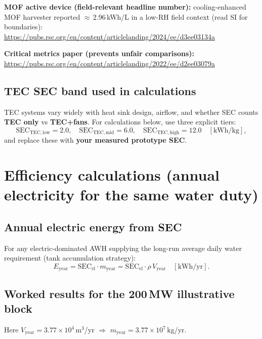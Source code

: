 \documentclass[11pt,a4paper]{article}
\begin{document}
\textbf{MOF active device (field-relevant headline number):} cooling-enhanced MOF harvester reported $\approx$\,2.96\,kWh/L in a low-RH field context (read SI for boundaries):\\
\url{https://pubs.rsc.org/en/content/articlelanding/2024/ee/d3ee03134a}

\textbf{Critical metrics paper (prevents unfair comparisons):}\\
\url{https://pubs.rsc.org/en/content/articlelanding/2022/ee/d2ee03079a}

\subsection{TEC SEC band used in calculations}
TEC systems vary widely with heat sink design, airflow, and whether SEC counts \textbf{TEC only} vs \textbf{TEC+fans}. For calculations below, use three explicit tiers:
\begin{equation}
\mathrm{SEC}_{\mathrm{TEC,low}}=2.0,\quad
\mathrm{SEC}_{\mathrm{TEC,mid}}=6.0,\quad
\mathrm{SEC}_{\mathrm{TEC,high}}=12.0\quad[\mathrm{kWh/kg}],
\end{equation}
and replace these with \textbf{your measured prototype SEC}.

\section{Efficiency calculations (annual electricity for the same water duty)}

\subsection{Annual electric energy from SEC}
For any electric-dominated AWH supplying the long-run average daily water requirement (tank accumulation strategy):
\begin{equation}
E_{\mathrm{year}}=\mathrm{SEC}_{\mathrm{el}}\cdot m_{\mathrm{year}}
=\mathrm{SEC}_{\mathrm{el}}\cdot \rho\,V_{\mathrm{year}}
\quad[\mathrm{kWh/yr}].
\end{equation}

\subsection{Worked results for the 200\,MW illustrative block}
Here $V_{\mathrm{year}}=3.77\times 10^4$\,m$^3$/yr $\Rightarrow$ $m_{\mathrm{year}}=3.77\times 10^7$\,kg/yr.
\end{document}
